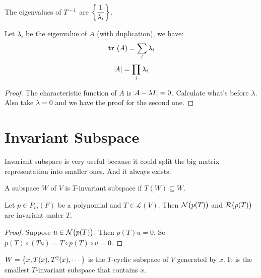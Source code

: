 \begin{theorem}
    The eigenvalues of ${T}^{-1}$ are $\displaystyle \set{\frac{1}{\lambda_i}}$.
\end{theorem}


\begin{theorem}
    Let $\lambda_i$ be the eigenvalue of $A$ (with duplication), we have:
    \begin{equation}
        \displaystyle \mathop{\bf tr\/}~( A ) = \sum_i \lambda_i
    \end{equation}
    \begin{equation}
        \abs{A} = \prod_i \lambda_i
    \end{equation}
\end{theorem}
\begin{proof}
    The characteristic function of $A$ is $\abs{A - \lambda I} = 0$. Calculate what's before $\lambda$. Also take $\lambda=0$ and we have the proof for the second one.
\end{proof}



\section{Invariant Subspace}

Invariant subspace is very useful because it could split the big matrix representation into smaller ones. And it always exists.

\begin{definition}
    A subspace $W$ of $V$ is $T$-invariant subspace if $T(W) \subseteq W$.
\end{definition}

\begin{theorem}
    Let $p \in P_m(F)$ be a polynomial and $T \in \mathcal{L}(V)$. Then $\nullspace{p(T)}$ and $\rangespace{p(T)}$ are invariant under $T$.
\end{theorem}
\begin{proof}
    Suppose $u \in \nullspace{p(T)}$. Then $p(T)u = 0$. So $p(T) \circ (Tu) = T \circ p(T) \circ u = 0$.
\end{proof}


\begin{definition}
    $W = \set{ x, T(x), T^2(x), \cdots}$ is the $T$-cyclic subspace of $V$ generated by $x$. It is the smallest $T$-invariant subspace that contains $x$.
\end{definition}


